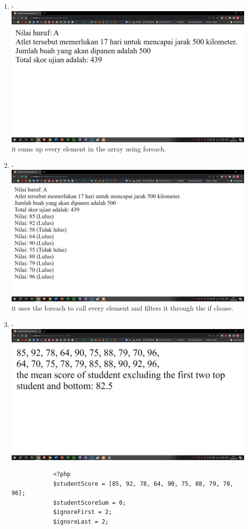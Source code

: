 \documentclass[12pt,titlepage]{article}
\begin{document}
\begin{enumerate}[label*=\arabic*.]
\begin{enumerate}[label*=\arabic*.]
        \item - \\ \includegraphics[width=.8\textwidth]{images/figures/fig11.png} \\ it sums up every element in the array using foreach.
        \newpage
        \item - \\ \includegraphics[width=.8\textwidth]{images/figures/fig12.png} \\ it uses the foreach to call every element and filters it through the if clause.
        \item - \\ \includegraphics[width=.8\textwidth]{images/figures/fig13.png}
        \begin{verbatim}
            <?php
            $studentScore = [85, 92, 78, 64, 90, 75, 88, 79, 70, 96];
            $studentScoreSum = 0;
            $ignoreFirst = 2;
            $ignoreLast = 2;


\end{verbatim}
\end{enumerate}
\end{enumerate}
\end{document}

